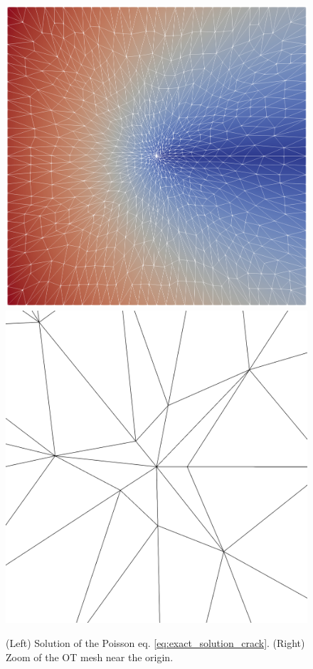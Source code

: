 \documentclass[a4paper,11pt]{article}
\begin{document}
{\begin{figure}[ht]
\centering
\includegraphics[scale=0.095]{Images/Test2/OT/u_OT.png}
\includegraphics[scale=0.075]{Images/Test2/OT/u_OT_zoom.png}
\caption{(Left) Solution of the Poisson eq. \ref{eq:exact_solution_crack}. (Right) Zoom of the OT mesh near the origin.}
\label{fig:OT_mesh_crack}
\end{figure}

}
\end{document}
